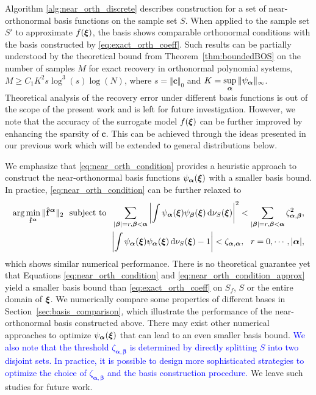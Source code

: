 Algorithm \ref{alg:near_orth_discrete} describes construction for a set of near-orthonormal  
basis functions on the sample set $S$. 
When applied to the sample set $S'$ to approximate $f(\bm\xi)$, the basis shows comparable orthonormal conditions with the basis constructed by \eqref{eq:exact_orth_coeff}. 
Such results can be partially understood by the theoretical bound from Theorem~\ref{thm:boundedBOS} on the number of samples $M$ for exact recovery in orthonormal polynomial systems, $\displaystyle M \ge C_1 K^2 s \log^3(s) \log(N)$, where $\displaystyle s = \Vert \bm{c}\Vert_0$ and $\displaystyle K = \sup_{\bm\alpha}\Vert \psi_{\bm\alpha}\Vert_{\infty}$.
Theoretical analysis of the recovery error under different basis functions is out of the scope of the present work and is left for future investigation.
However, we note that the accuracy of the surrogate model $f(\bm\xi)$ can be further improved by enhancing the sparsity of $\bm c.$
This can be achieved through the ideas presented in our previous work \cite{Lei_Yang_MMS_2015} which will be extended to general distributions below.

\begin{rem}
  We emphasize that \eqref{eq:near_orth_condition} provides a heuristic approach to construct the near-orthonormal 
 basis functions $\psi_{\bm\alpha}(\bm\xi)$ with {\color{blue}a} smaller basis bound.
  In practice, \eqref{eq:near_orth_condition} can be further relaxed to
  \begin{equation}
    \begin{split}
      \arg\min_{\hat{\mathbf{f}}^{\bm\alpha}} \Vert \hat{\mathbf{f}}^{\bm\alpha}\Vert_2~~\mbox{subject to}~~ \sum_{\vert\bm\beta\vert = r, \bm\beta < \bm\alpha} \left \vert \int \psi_{\bm{\alpha}}(\bm{\xi}) \psi_{\bm{\beta}}(\bm{\xi}) \,\mathrm{d} \nu_{S}(\bm\xi) \right \vert^2 < \sum_{\vert\bm\beta\vert = r, \bm\beta < \bm\alpha} \zeta_{\bm\alpha,\bm\beta}^2, \\
      \left \vert \int \psi_{\bm{\alpha}}(\bm{\xi}) \psi_{\bm\alpha}(\bm{\xi}) \,\mathrm{d} \nu_{S}(\bm\xi) - 1 \right \vert < \zeta_{\bm\alpha,\bm\alpha},~~ r = 0,\cdots, \vert\bm\alpha\vert,
    \end{split} \label{eq:near_orth_condition_approx}
  \end{equation}
which shows similar numerical performance.
There is no theoretical guarantee yet that Equations \eqref{eq:near_orth_condition} and \eqref{eq:near_orth_condition_approx} 
yield a smaller basis bound than \eqref{eq:exact_orth_coeff} on ${S_f}$, $S$ or the entire domain of $\bm\xi$.
We numerically compare some properties of different bases in Section~\ref{sec:basis_comparison}, which illustrate the 
performance of the near-orthonormal  basis constructed above.
There may exist other numerical approaches to optimize $\psi_{\bm\alpha}(\bm\xi)$ that can lead to an even smaller basis bound. 
\textcolor{blue}{We also note that the threshold $\zeta_{\bm{\alpha},\bm{\beta}}$ is determined by directly splitting $S$ into
two disjoint sets. In practice, it is possible to design more sophisticated strategies to optimize the choice 
of $ \zeta_{\bm{\alpha},\bm{\beta}}$ and the basis construction procedure.} We leave such studies for future work.
\end{rem}

